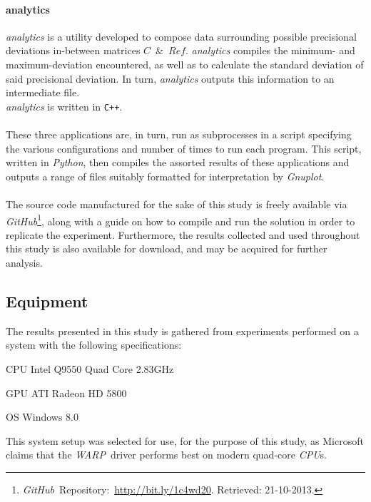 \documentclass[fleqn,10pt]{SelfArx} %
\begin{document}
\paragraph{analytics}
\textit{analytics} is a utility developed to compose data surrounding possible precisional deviations in-between matrices $C$~\&~$Ref$. \textit{analytics} compiles the minimum- and maximum-deviation encountered, as well as to calculate the standard deviation of said precisional deviation. In turn, \textit{analytics} outputs this information to an intermediate file.\\
\textit{analytics} is written in \texttt{C++}.\\
\\
\noindent
These three applications are, in turn, run as subprocesses in a script specifying the various configurations and number of times to run each program. This script, written in \textit{Python}, then compiles the assorted results of these applications and outputs a range of files suitably formatted for interpretation by \textit{Gnuplot}.\\
\\
The source code manufactured for the sake of this study is freely available via \textit{GitHub}\footnote{\label{ftn:github}\textit{GitHub}~Repository:~\url{http://bit.ly/1c4wd20}. Retrieved: 21-10-2013.}, along with a guide on how to compile and run the solution in order to replicate the experiment. Furthermore, the results collected and used throughout this study is also available for download, and may be acquired for further analysis.

\subsection{Equipment}
\label{sec:contribution:equipment}
The results presented in this study is gathered from experiments performed on a system with the following specifications:
\begin{description*}
	\item[CPU]	Intel Q9550 Quad Core 2.83GHz
	\item[GPU]	ATI Radeon HD 5800
	\item[OS]	Windows 8.0
\end{description*}
This system setup was selected for use, for the purpose of this study, as Microsoft claims that the \textit{WARP}~driver performs best on modern quad-core \textit{CPU}s.
\end{document}
